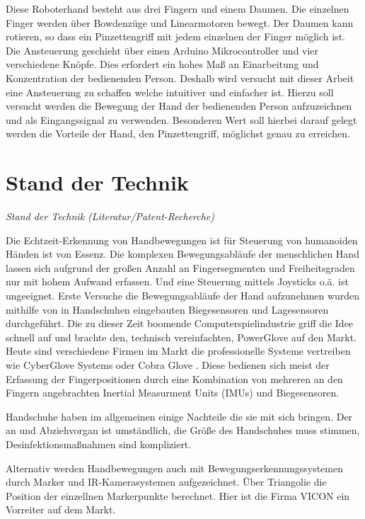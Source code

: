 \documentclass[a4paper,12pt,final]{article} %
\numberwithin{equation}{section} %
\numberwithin{figure}{section} %
\numberwithin{table}{section} %
\begin{document}
Diese Roboterhand besteht aus drei Fingern und einem Daumen. Die einzelnen Finger werden über Bowdenzüge und Linearmotoren bewegt. Der Daumen kann rotieren, so dass ein Pinzettengriff mit jedem einzelnen der Finger möglich ist.
Die Ansteuerung geschieht über einen Arduino Mikrocontroller und vier verschiedene Knöpfe. Dies erfordert ein hohes Maß an Einarbeitung und Konzentration der bedienenden Person.
Deshalb wird versucht mit dieser Arbeit eine Ansteuerung zu schaffen welche intuitiver und einfacher ist. Hierzu soll versucht werden die Bewegung der Hand der bedienenden Person aufzuzeichnen und als Eingangssignal zu verwenden.
Besonderen Wert soll hierbei darauf gelegt werden die Vorteile der Hand, den Pinzettengriff, möglichst genau zu erreichen.
\newpage
\section{Stand der Technik}
\emph{Stand der Technik (Literatur/Patent-Recherche)}

Die Echtzeit-Erkennung von Handbewegungen ist für Steuerung von humanoiden Händen ist von Essenz. Die komplexen Bewegungsabläufe der menschlichen Hand lassen sich aufgrund der großen Anzahl an Fingersegmenten und Freiheitsgraden nur mit hohem Aufwand erfassen. Und eine Steuerung mittels Joysticks o.ä. ist ungeeignet.
Erste Versuche die Bewegungsabläufe der Hand aufzunehmen wurden mithilfe von in Handschuhen eingebauten Biegesensoren \cite{FlexSensor} und Lagesensoren durchgeführt.  Die zu dieser Zeit boomende Computerspielindustrie griff die Idee schnell auf und brachte den, technisch vereinfachten, PowerGlove \cite{PowerGlove} auf den Markt. Heute sind verschiedene Firmen im Markt die professionelle Systeme vertreiben wie CyberGlove Systems \cite{CyberGlove} oder Cobra Glove \cite{CobraGlove}. Diese bedienen sich meist der Erfassung der Fingerpositionen durch eine Kombination von mehreren an den Fingern angebrachten Inertial Measurment Units (IMUs) und Biegesensoren.

Handschuhe haben im allgemeinen einige Nachteile die sie mit sich bringen. Der an und Abziehvorgan ist umständlich, die Größe des Handschuhes muss stimmen, Desinfektionsmaßnahmen sind kompliziert.

Alternativ werden Handbewegungen auch mit Bewe\-gungs\-er\-kenn\-ungs\-sys\-temen durch Marker und IR-Kamera\-systemen aufgezeichnet. Über Triangolie die Position der einzellnen Markerpunkte berechnet. Hier ist die Firma VICON ein Vorreiter auf dem Markt.
\end{document}

